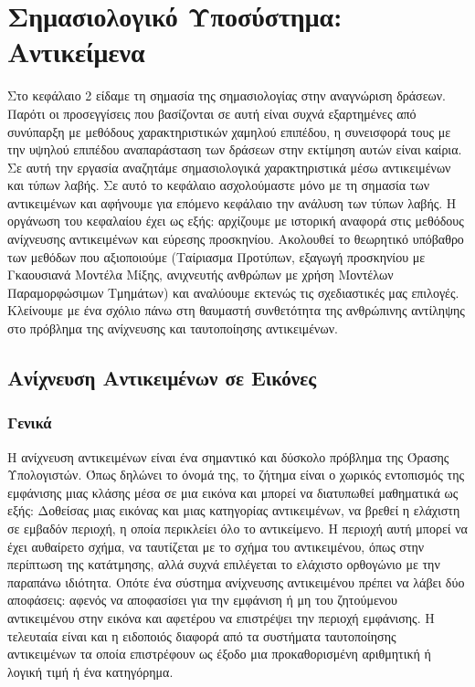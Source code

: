 \documentclass[11pt,a4paper,english,greek,twoside]{../Thesis}
\begin{document}
\chapter{Σημασιολογικό Υποσύστημα: Αντικείμενα} \label{chap:Experiments}
Στο κεφάλαιο 2 είδαμε τη σημασία της σημασιολογίας στην αναγνώριση δράσεων. Παρότι οι προσεγγίσεις που βασίζονται σε αυτή είναι συχνά εξαρτημένες από συνύπαρξη με μεθόδους χαρακτηριστικών χαμηλού επιπέδου, η συνεισφορά τους με την υψηλού επιπέδου αναπαράσταση των δράσεων στην εκτίμηση αυτών είναι καίρια. Σε αυτή την εργασία αναζητάμε σημασιολογικά χαρακτηριστικά μέσω αντικειμένων και τύπων λαβής. Σε αυτό το κεφάλαιο ασχολούμαστε μόνο με τη σημασία των αντικειμένων και αφήνουμε για επόμενο κεφάλαιο την ανάλυση των τύπων λαβής. Η οργάνωση του κεφαλαίου έχει ως εξής: αρχίζουμε με ιστορική αναφορά στις μεθόδους ανίχνευσης αντικειμένων και εύρεσης προσκηνίου. Ακολουθεί το θεωρητικό υπόβαθρο των μεθόδων που αξιοποιούμε (Ταίριασμα Προτύπων, εξαγωγή προσκηνίου με Γκαουσιανά Μοντέλα Μίξης, ανιχνευτής ανθρώπων με χρήση Μοντέλων Παραμορφώσιμων Τμημάτων) και αναλύουμε εκτενώς τις σχεδιαστικές μας επιλογές. Κλείνουμε με ένα σχόλιο πάνω στη θαυμαστή συνθετότητα της ανθρώπινης αντίληψης στο πρόβλημα της ανίχνευσης και ταυτοποίησης αντικειμένων.


\section{Ανίχνευση Αντικειμένων σε Εικόνες}
\subsection{Γενικά}
Η ανίχνευση αντικειμένων είναι ένα σημαντικό και δύσκολο πρόβλημα της Όρασης Υπολογιστών. Όπως δηλώνει το όνομά της, το ζήτημα είναι ο χωρικός εντοπισμός της εμφάνισης μιας κλάσης μέσα σε μια εικόνα και μπορεί να διατυπωθεί μαθηματικά ως εξής: Δοθείσας μιας εικόνας και μιας κατηγορίας αντικειμένων, να βρεθεί η ελάχιστη σε εμβαδόν περιοχή, η οποία περικλείει όλο το αντικείμενο. Η περιοχή αυτή μπορεί να έχει αυθαίρετο σχήμα, να ταυτίζεται με το σχήμα του αντικειμένου, όπως στην περίπτωση της κατάτμησης, αλλά συχνά επιλέγεται το ελάχιστο ορθογώνιο με την παραπάνω ιδιότητα. Οπότε ένα σύστημα ανίχνευσης αντικειμένου πρέπει να λάβει δύο αποφάσεις: αφενός να αποφασίσει για την εμφάνιση ή μη του ζητούμενου αντικειμένου στην εικόνα και αφετέρου να επιστρέψει την περιοχή εμφάνισης. Η τελευταία είναι και η ειδοποιός διαφορά από τα συστήματα ταυτοποίησης αντικειμένων τα οποία επιστρέφουν ως έξοδο μια προκαθορισμένη αριθμητική ή λογική τιμή ή ένα κατηγόρημα.
\end{document}
